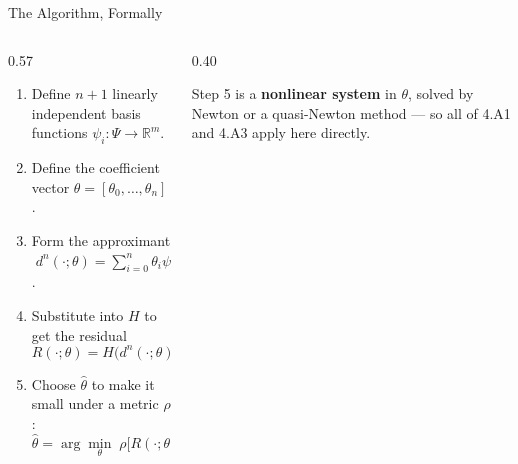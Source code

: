 \begin{frame}{The Algorithm, Formally}
\begin{columns}[T]
\begin{column}{0.57\textwidth}
\small
\begin{enumerate}\small\setlength{\itemsep}{1.2mm}
  \item Define $n+1$ linearly independent basis functions $\psi_i:\Psi\to\mathbb{R}^{m}$.
  \item Define the coefficient vector $\theta=[\theta_0,\dots,\theta_n]$.
  \item Form the approximant $\;d^{n}(\cdot;\theta)=\sum_{i=0}^{n}\theta_i\psi_i(\cdot)$.
  \item Substitute into $H$ to get the residual
  \[
    R(\cdot;\theta)=H\big(d^{n}(\cdot;\theta)\big).
  \]
  \item Choose $\hat{\theta}$ to make it small under a metric $\rho$:
  \[
    \hat{\theta}=\arg\min_{\theta}\;\rho\big[R(\cdot;\theta)\big].
  \]
\end{enumerate}
\end{column}
\begin{column}{0.40\textwidth}
\begin{conceptbox}[title=\textbf{Where the work is}]\small
Step 5 is a \textbf{nonlinear system} in $\theta$, solved by Newton or a quasi-Newton method --- so all of 4.A1 and 4.A3 apply here directly.
\end{conceptbox}
\end{column}
\end{columns}
\vspace{1mm}
\end{frame}

